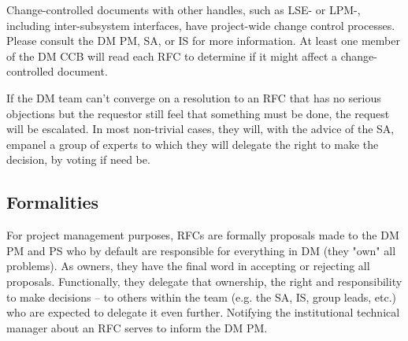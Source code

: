Change-controlled documents with other handles, such as LSE- or LPM-, including inter-subsystem interfaces, have project-wide change control processes. Please consult the DM PM, SA, or IS for more information.
At least one member of the DM CCB will read each RFC to determine if it might affect a change-controlled document.

If the DM team can't converge on a resolution to an RFC that has no serious objections but the requestor still feel that something must be done, the request will be escalated. In most non-trivial cases, they will, with the advice of the SA, empanel a group of experts to which they will delegate the right to make the decision, by voting if need be.

\subsection{Formalities}
For project management purposes, RFCs are formally proposals made to the DM PM and PS who by default are responsible for everything in DM (they "own" all problems). As owners, they have the final word in accepting or rejecting all proposals. Functionally, they delegate that ownership, the right and responsibility to make decisions -- to others within the team (e.g. the SA, IS, group leads, etc.) who are expected to delegate it even further. Notifying the institutional technical manager about an RFC serves to inform the DM PM.

